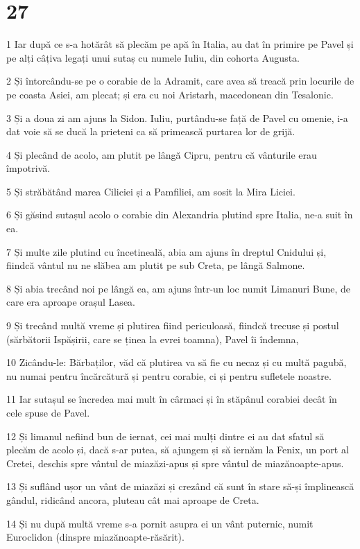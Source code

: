 \chapter{27}

\par 1 Iar după ce s-a hotărât să plecăm pe apă în Italia, au dat în primire pe Pavel și pe alți câțiva legați unui sutaș cu numele Iuliu, din cohorta Augusta.
\par 2 Și întorcându-se pe o corabie de la Adramit, care avea să treacă prin locurile de pe coasta Asiei, am plecat; și era cu noi Aristarh, macedonean din Tesalonic.
\par 3 Și a doua zi am ajuns la Sidon. Iuliu, purtându-se față de Pavel cu omenie, i-a dat voie să se ducă la prieteni ca să primească purtarea lor de grijă.
\par 4 Și plecând de acolo, am plutit pe lângă Cipru, pentru că vânturile erau împotrivă.
\par 5 Și străbătând marea Ciliciei și a Pamfiliei, am sosit la Mira Liciei.
\par 6 Și găsind sutașul acolo o corabie din Alexandria plutind spre Italia, ne-a suit în ea.
\par 7 Și multe zile plutind cu încetineală, abia am ajuns în dreptul Cnidului și, fiindcă vântul nu ne slăbea am plutit pe sub Creta, pe lângă Salmone.
\par 8 Și abia trecând noi pe lângă ea, am ajuns într-un loc numit Limanuri Bune, de care era aproape orașul Lasea.
\par 9 Și trecând multă vreme și plutirea fiind periculoasă, fiindcă trecuse și postul (sărbătorii Ispășirii, care se ținea la evrei toamna), Pavel îi îndemna,
\par 10 Zicându-le: Bărbaților, văd că plutirea va să fie cu necaz și cu multă pagubă, nu numai pentru încărcătură și pentru corabie, ci și pentru sufletele noastre.
\par 11 Iar sutașul se încredea mai mult în cârmaci și în stăpânul corabiei decât în cele spuse de Pavel.
\par 12 Și limanul nefiind bun de iernat, cei mai mulți dintre ei au dat sfatul să plecăm de acolo și, dacă s-ar putea, să ajungem și să iernăm la Fenix, un port al Cretei, deschis spre vântul de miazăzi-apus și spre vântul de miazănoapte-apus.
\par 13 Și suflând ușor un vânt de miazăzi și crezând că sunt în stare să-și împlinească gândul, ridicând ancora, pluteau cât mai aproape de Creta.
\par 14 Și nu după multă vreme s-a pornit asupra ei un vânt puternic, numit Euroclidon (dinspre miazănoapte-răsărit).
